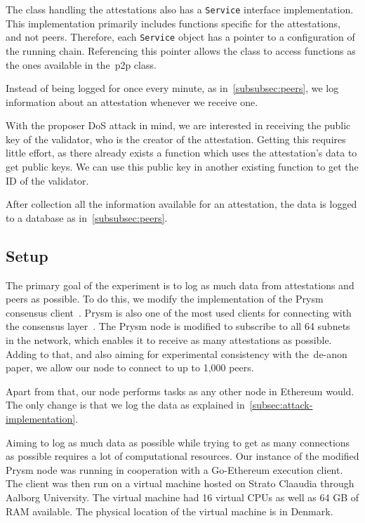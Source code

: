 The class handling the attestations also has a \texttt{Service} interface implementation.
This implementation primarily includes functions specific for the attestations, and not peers.
Therefore, each \texttt{Service} object has a pointer to a configuration of the running chain.
Referencing this pointer allows the class to access functions as the ones available in the~\gls{p2p} class.

Instead of being logged for once every minute, as in~\autoref{subsubsec:peers},
we log information about an attestation whenever we receive one.

With the proposer DoS attack in mind, we are interested in receiving the public key of the validator,
who is the creator of the attestation.
Getting this requires little effort,
as there already exists a function which uses the attestation's data to get public keys.
We can use this public key in another existing function to get the ID of the validator.

After collection all the information available for an attestation,
the data is logged to a database as in~\autoref{subsubsec:peers}.

\subsection{Setup}\label{subsec:setup}
The primary goal of the experiment is to log as much data from attestations and peers as possible.
To do this, we modify the implementation of the Prysm consensus client~\cite{prysm}.
Prysm is also one of the most used clients for connecting with the consensus layer~\cite{client-diversity}.
The Prysm node is modified to subscribe to all 64 subnets in the network, which enables it to receive as many attestations as possible.
Adding to that, and also aiming for experimental consistency with the~\gls{de-anon paper}, we allow our node to connect to up to 1,000 peers.

Apart from that, our node performs tasks as any other node in Ethereum would.
The only change is that we log the data as explained in~\autoref{subsec:attack-implementation}.

Aiming to log as much data as possible while trying to get as many connections as possible requires a lot of computational resources.
Our instance of the modified Prysm node was running in cooperation with a Go-Ethereum execution client.
The client was then run on a virtual machine hosted on Strato Claaudia through Aalborg University.
The virtual machine had 16 virtual CPUs as well as 64 GB of RAM available.
The physical location of the virtual machine is in Denmark.


